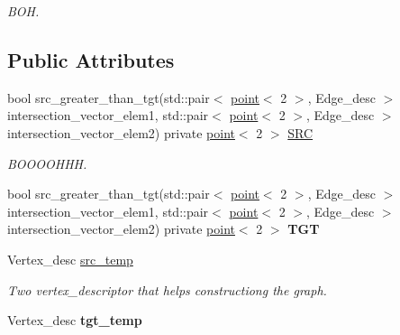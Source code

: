 \begin{DoxyCompactItemize}
\begin{DoxyCompactList}\small\item\em BOH. \item\end{DoxyCompactList}\end{DoxyCompactItemize}
\subsection*{Public Attributes}
\begin{DoxyCompactItemize}
\item 
bool src\_\-greater\_\-than\_\-tgt(std::pair$<$ \hyperlink{classpoint}{point}$<$ 2 $>$, Edge\_\-desc $>$ intersection\_\-vector\_\-elem1, std::pair$<$ \hyperlink{classpoint}{point}$<$ 2 $>$, Edge\_\-desc $>$ intersection\_\-vector\_\-elem2) private \hyperlink{classpoint}{point}$<$ 2 $>$ \hyperlink{classreader__Formaggia_a890594cb9412b19c8a6131c62e60ff0a}{SRC}
\begin{DoxyCompactList}\small\item\em BOOOOHHH. \item\end{DoxyCompactList}\item 
\hypertarget{classreader__Formaggia_acc872eddc4f6e458c09cce6d9c6aacc5}{
bool src\_\-greater\_\-than\_\-tgt(std::pair$<$ \hyperlink{classpoint}{point}$<$ 2 $>$, Edge\_\-desc $>$ intersection\_\-vector\_\-elem1, std::pair$<$ \hyperlink{classpoint}{point}$<$ 2 $>$, Edge\_\-desc $>$ intersection\_\-vector\_\-elem2) private \hyperlink{classpoint}{point}$<$ 2 $>$ {\bfseries TGT}}
\label{classreader__Formaggia_acc872eddc4f6e458c09cce6d9c6aacc5}

\item 
\hypertarget{classreader__Formaggia_a259adaa8e6f13a67421e64666cae1df2}{
Vertex\_\-desc \hyperlink{classreader__Formaggia_a259adaa8e6f13a67421e64666cae1df2}{src\_\-temp}}
\label{classreader__Formaggia_a259adaa8e6f13a67421e64666cae1df2}

\begin{DoxyCompactList}\small\item\em Two vertex\_\-descriptor that helps constructiong the graph. \item\end{DoxyCompactList}\item 
\hypertarget{classreader__Formaggia_ab3d58e42d5f284f71a7858008ab16c25}{
Vertex\_\-desc {\bfseries tgt\_\-temp}}
\label{classreader__Formaggia_ab3d58e42d5f284f71a7858008ab16c25}

\end{DoxyCompactItemize}
